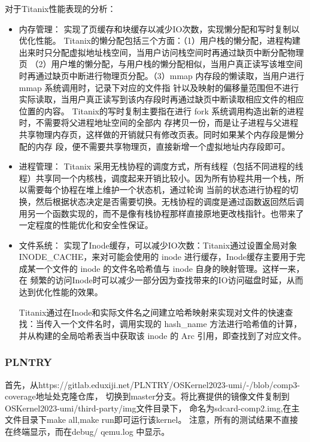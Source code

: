 对于Titanix性能表现的分析：
\begin{itemize}
    \item 内存管理：
    实现了页缓存和块缓存以减少IO次数，实现懒分配和写时复制以优化性能。
    Titanix的懒分配包括三个方面：（1）用户栈的懒分配，进程构建出来时只分配虚拟地址栈空间，当用户访问栈空间时再通过缺页中断分配物理页
    （2）用户堆的懒分配，与用户栈的懒分配相似，当用户真正读写该堆空间时再通过缺页中断进行物理页分配。（3）mmap 内存段的懒读取，当用户进行 mmap 系统调用时，记录下对应的文件指
    针以及映射的偏移量范围但不进行实际读取，当用户真正读写到该内存段时再通过缺页中断读取相应文件的相应位置的内容。
    Titanix的写时复制主要指在进行 fork 系统调用构造出新的进程时，不需要将父进程地址空间的全部内
    存拷贝一份，而是让子进程与父进程共享物理内存页，这样做的开销就只有修改页表。同时如果某个内存段是懒分配的内存
    段，便不需要共享物理页，直接新增一个虚拟地址内存段即可。
    \item 进程管理：
    Titanix 采用无栈协程的调度方式，所有线程（包括不同进程的线程）共享同一个内核栈，调度起来开销比较小。因为所有协程共用一个栈，所以需要每个协程在堆上维护一个状态机，通过轮询
    当前的状态进行协程的切换，然后根据状态决定是否需要切换。无栈协程的调度是通过函数返回然后调用另一个函数实现的，而不是像有栈协程那样直接原地更改栈指针。也带来了一定程度的性能优化和安全性保证。
    \item 文件系统：
    实现了Inode缓存，可以减少IO次数：Titanix通过设置全局对象 INODE_CACHE，来对可能会使用的 inode 进行缓存，Inode缓存主要用于完成某一个文件的 inode 的文件名哈希值与 inode 自身的映射管理。这样一来，在
    频繁的访问Inode时可以减少一部分因为查找带来的IO访问磁盘时延，从而达到优化性能的效果。
    
    Titanix通过在Inode和实际文件名之间建立哈希映射来实现对文件的快速查找：当传入一个文件名时，调用实现的 hash_name 方法进行哈希值的计算，并从构建的全局哈希表当中获取该 inode 的
    Arc 引用，即查找到了对应文件。


\end{itemize}

\subsubsection{PLNTRY}

首先，从https://gitlab.eduxiji.net/PLNTRY/OSKernel2023-umi/-/blob/comp3-coverage地址处克隆仓库，
切换到master分支。将比赛提供的镜像文件复制到OSKernel2023-umi/third-party/img文件目录下，
命名为sdcard-comp2.img,在主文件目录下make all,make run即可运行该kernel。
注意，所有的测试结果不直接在终端显示，而在debug/ qemu.log 中显示。




